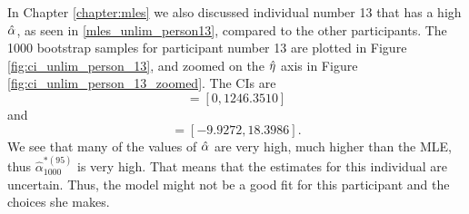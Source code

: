 In Chapter \ref{chapter:mles} we also discussed individual number 13 that has a high $\hat{\alpha}$, as seen in \eqref{mles_unlim_person13}, compared to the other participants. The 1000 bootstrap samples for participant number 13 are plotted in Figure \ref{fig:ci_unlim_person_13}, and zoomed on the $\hat{\eta}$ axis in Figure \ref{fig:ci_unlim_person_13_zoomed}. The CIs are
\begin{equation*}
    [\hat{\alpha}^{*(5)}_{1000},\hat{\alpha}^{*(95)}_{1000}] = [0,1246.3510]
\end{equation*}
and
\begin{equation*}
    [\hat{\eta}^{*(5)}_{1000},\hat{\eta}^{*(95)}_{1000}] = [-9.9272,18.3986].
\end{equation*}
We see that many of the values of $\hat{\alpha}$ are very high, much higher than the MLE, thus $\hat{\alpha}^{*(95)}_{1000}$ is very high. That means that the estimates for this individual are uncertain. Thus, the model might not be a good fit for this participant and the choices she makes. 
